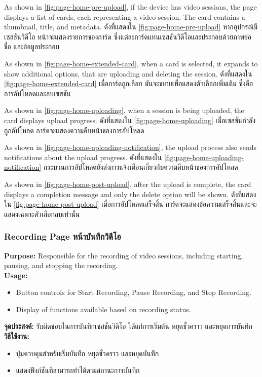 \pageHomePreUpload

\ifenglish
    As shown in \ref{fig:page-home-pre-upload}, if the device has video sessions, the page displays a list of cards, each representing a video session. The card contains a thumbnail, title, and metadata.
\else
    ดังที่แสดงใน \ref{fig:page-home-pre-upload} หากอุปกรณ์มีเซสชันวิดีโอ หน้าจะแสดงรายการของการ์ด ซึ่งแต่ละการ์ดแทนเซสชันวิดีโอและประกอบด้วยภาพย่อ ชื่อ และข้อมูลประกอบ
\fi

\pageHomeExtendedCard

\ifenglish
    As shown in \ref{fig:page-home-extended-card}, when a card is selected, it expands to show additional options, that are uploading and deleting the session.
\else
    ดังที่แสดงใน \ref{fig:page-home-extended-card} เมื่อการ์ดถูกเลือก มันจะขยายเพื่อแสดงตัวเลือกเพิ่มเติม ซึ่งคือการอัปโหลดและลบเซสชัน
\fi

\pageHomeUploading

\ifenglish
    As shown in \ref{fig:page-home-uploading}, when a session is being uploaded, the card displays upload progress.
\else
    ดังที่แสดงใน \ref{fig:page-home-uploading} เมื่อเซสชันกำลังถูกอัปโหลด การ์ดจะแสดงความคืบหน้าของการอัปโหลด
\fi 

\pageHomeUploadingNotificaiton

\ifenglish
    As shown in \ref{fig:page-home-uploading-notification}, the upload process also sends notifications about the upload progress.
\else
    ดังที่แสดงใน \ref{fig:page-home-uploading-notification} กระบวนการอัปโหลดยังส่งการแจ้งเตือนเกี่ยวกับความคืบหน้าของการอัปโหลด
\fi

\pageHomePostUpload

\ifenglish
    As shown in \ref{fig:page-home-post-upload}, after the upload is complete, the card displays a completion message and only the delete option will be shown.
\else
    ดังที่แสดงใน \ref{fig:page-home-post-upload} เมื่อการอัปโหลดเสร็จสิ้น การ์ดจะแสดงข้อความเสร็จสิ้นและจะแสดงเฉพาะตัวเลือกลบเท่านั้น
\fi 

\subsubsection{\ifenglish Recording Page \else หน้าบันทึกวิดีโอ \fi}
\ifenglish
\textbf{Purpose:} Responsible for the recording of video sessions, including starting, pausing, and stopping the recording.\\
\textbf{Usage:}
\begin{itemize}
    \item Button controls for Start Recording, Pause Recording, and Stop Recording.
    \item Display of functions available based on recording status.
\end{itemize}
\else
\textbf{จุดประสงค์:} รับผิดชอบในการบันทึกเซสชันวิดีโอ ได้แก่การเริ่มต้น หยุดชั่วคราว และหยุดการบันทึก\\
\textbf{วิธีใช้งาน:}
\begin{itemize}
    \item ปุ่มควบคุมสำหรับเริ่มบันทึก หยุดชั่วคราว และหยุดบันทึก
    \item แสดงฟังก์ชันที่สามารถทำได้ตามสถานะการบันทึก
\end{itemize}
\fi

